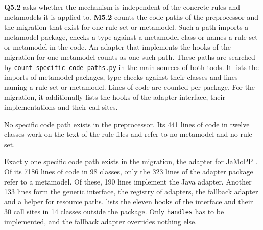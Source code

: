 \textbf{Q5.2} asks whether the mechanism is independent of the concrete rules and metamodels it is applied to.
\textbf{M5.2} counts the code paths of the preprocessor and the migration that exist for one rule set or metamodel.
Such a path imports a metamodel package, checks a type against a metamodel class or names a rule set or metamodel in the code.
An adapter that implements the hooks of the migration for one metamodel counts as one such path.
These paths are searched by \texttt{count-specific-code-paths.py} in the main sources of both tools.
It lists the imports of metamodel packages, type checks against their classes and lines naming a rule set or metamodel.
Lines of code are counted per package.
For the migration, it additionally lists the hooks of the adapter interface, their implementations and their call sites.

No specific code path exists in the preprocessor.
Its 441 lines of code in twelve classes work on the text of the rule files and refer to no metamodel and no rule set.

Exactly one specific code path exists in the migration, the adapter for JaMoPP \cite{heidenreich2009closing}.
Of its 7186 lines of code in 98 classes, only the 323 lines of the adapter package refer to a metamodel.
Of these, 190 lines implement the Java adapter.
Another 133 lines form the generic interface, the registry of adapters, the fallback adapter and a helper for resource paths.
 lists the eleven hooks of the interface and their 30 call sites in 14 classes outside the package.
Only \texttt{handles} has to be implemented, and the fallback adapter overrides nothing else.

